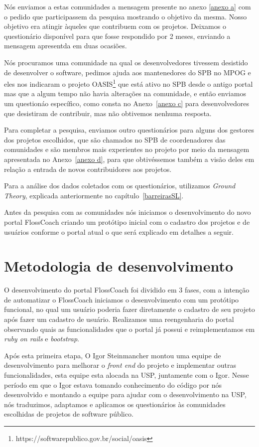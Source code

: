 Nós enviamos a estas comunidades a mensagem presente no anexo \ref{anexo a}
com o pedido que participassem da pesquisa mostrando o objetivo da mesma. Nosso objetivo 
era atingir àqueles que contribuem com os projetos. Deixamos o questionário disponível 
para que fosse respondido por 2 meses, enviando a mensagem apresentda em duas ocasiões.

Nós procuramos uma comunidade na qual os desenvolvedores tivessem desistido
de desenvolver o software, pedimos ajuda aos mantenedores do SPB no MPOG e eles nos 
indicaram o projeto OASIS\footnote{https://softwarepublico.gov.br/social/oasis} que 
está ativo no SPB desde o antigo portal mas que a algum tempo não havia alterações
na comunidade, e então enviamos um questionáo específico, como consta no Anexo~\ref{anexo c} 
para desenvolvedores que desistiram de contribuir, mas não obtivemos nenhuma resposta. 

Para completar a pesquisa, enviamos outro questionários para alguns dos gestores dos
projetos escolhidos, que são chamados no SPB de coordenadores das comunidades e 
são membros mais experientes no projeto por meio da mensagem apresentada no Anexo~\ref{anexo d}, 
para que obtivéssemos também a visão deles em relação a entrada de novos contribuidores aos projetos. 

Para a análise dos dados coletados com os questionários, utilizamos \textit{Ground Theory}, 
explicada anteriormente no capítulo~\ref{barreirasSL}.

Antes da pesquisa com as comunidades nós iniciamos o desenvolvimento do novo portal
FlossCoach criando um protótipo inicial com o cadastro dos projetos e de usuários 
conforme o portal atual o que será explicado em detalhes a seguir. 

\section{Metodologia de desenvolvimento}

O desenvolvimento do portal FlossCoach foi dividido em 3 fases, com a intenção de 
automatizar o FlossCoach iniciamos o desenvolvimento com um protótipo funcional, no qual 
um usuário poderia fazer diretamente o cadastro de seu projeto após fazer um cadastro de 
usuário. Realizamos uma reengenharia do portal observando quais as funcionalidades 
que o portal já possui e reimplementamos em \textit{ruby on rails} e \textit{bootstrap}.

Após esta primeira etapa, O Igor Steinmancher montou uma equipe de desenvolvimento 
para melhorar o \textit{front end} do projeto e implementar outras funcionalidades, 
esta equipe esta alocada na USP, juntamente com o Igor. Nesse período em que o Igor 
estava tomando conhecimento do código por nós desenvolvido e montando a equipe para
ajudar com o desenvolvimento na USP, nós traduzimos, adaptamos e aplicamos os questionários
às comunidades escolhidas de projetos de software público.

